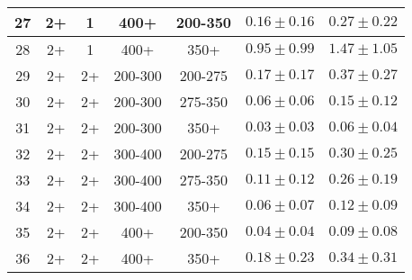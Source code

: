 \begin{table}[htbp]
{\begin{tabular}{|c|c|c|c|c||c|c|}
 \hline
             27 &              2+ &               1 &            400+ &         200-350 & $0.16 \pm 0.16$ & $ 0.27 \pm 0.22 $\\
 \hline
             28 &              2+ &               1 &            400+ &            350+ & $0.95 \pm 0.99$ & $ 1.47 \pm 1.05 $\\
 \hline
             29 &              2+ &              2+ &         200-300 &         200-275 & $0.17 \pm 0.17$ & $ 0.37 \pm 0.27 $\\
 \hline
             30 &              2+ &              2+ &         200-300 &         275-350 & $0.06 \pm 0.06$ & $ 0.15 \pm 0.12 $\\
 \hline
             31 &              2+ &              2+ &         200-300 &            350+ & $0.03 \pm 0.03$ & $ 0.06 \pm 0.04 $\\
 \hline
             32 &              2+ &              2+ &         300-400 &         200-275 & $0.15 \pm 0.15$ & $ 0.30 \pm 0.25 $\\
 \hline
             33 &              2+ &              2+ &         300-400 &         275-350 & $0.11 \pm 0.12$ & $ 0.26 \pm 0.19 $\\
 \hline
             34 &              2+ &              2+ &         300-400 &            350+ & $0.06 \pm 0.07$ & $0.12 \pm 0.09 $\\
 \hline
             35 &              2+ &              2+ &            400+ &         200-350 & $0.04 \pm 0.04$ & $ 0.09 \pm 0.08 $\\
 \hline
             36 &              2+ &              2+ &            400+ &            350+ & $0.18 \pm 0.23$ & $ 0.34 \pm 0.31 $\\
 \hline
\end{tabular}
}
\end{table}


